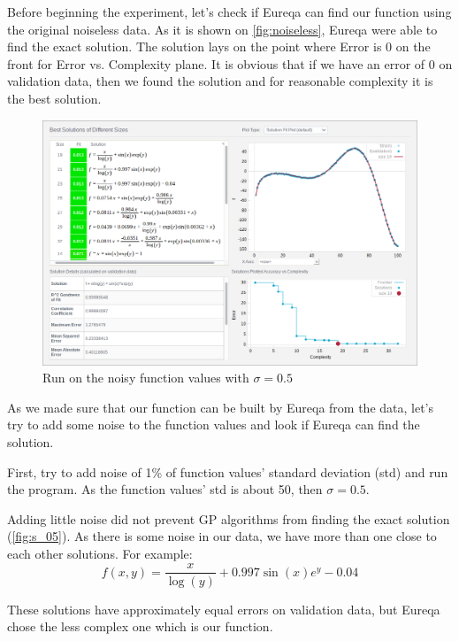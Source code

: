 \documentclass[12pt]{article}
\begin{document}
    Before beginning the experiment, let's check if Eureqa can find our function
    using the original noiseless data. As it is shown on \autoref{fig:noiseless},
    Eureqa were able to find the exact solution. The solution lays on the point
    where Error is 0 on the front for Error vs. Complexity plane. It is obvious
    that if we have an error of 0 on validation data, then we found the solution
    and for reasonable complexity it is the best solution.

    \begin{figure}[H]
        \centering
        \includegraphics[width=\linewidth]{pics/sol_1perc.png}
        \caption{Run on the noisy function values with $\sigma = 0.5$}
        \label{fig:s_05}
    \end{figure}

    As we made sure that our function can be built by Eureqa from the data, let's
    try to add some noise to the function values and look if Eureqa can find the
    solution.

    First, try to add noise of 1\% of function values' standard deviation (std)
    and run the program. As the function values' std is about 50, then $\sigma=0.5$.

    Adding little noise did not prevent GP algorithms from finding the exact solution
    (\autoref{fig:s_05}). As there is some noise in our data, we have more than
    one close to each other solutions. For example:
    $$f(x, y) = \frac{x}{\log(y)} + 0.997\sin(x)e^y - 0.04$$

    These solutions have approximately equal errors on validation data, but Eureqa
    chose the less complex one which is our function.
\end{document}
